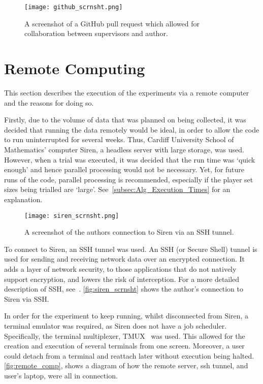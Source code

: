 \begin{figure}
    \centering
    \texttt{[image: github\_scrnsht.png]}
    \caption{A screenshot of a GitHub pull request which allowed for collaboration between supervisors and author.}\label{fig:github_scrnsht}
\end{figure}


\section{Remote Computing}\label{sec:Remote_Computing}
This section describes the execution of the experiments via a remote
computer and the reasons for doing so.

Firstly, due to the volume of data that was planned on being collected, it was
decided that running the data remotely would be ideal, in order to allow the
code to run uninterrupted for several weeks. Thus, Cardiff University School of
Mathematics' computer Siren, a headless server with large storage, was used. However, when a trial was executed,
it was decided that the run time was `quick enough' and hence parallel
processing would not be necessary. Yet, for future runs of the code, parallel
processing is recommended, especially if the player set sizes being trialled are
`large'. See~\autoref{subsec:Alg_Execution_Times} for an explanation.

\begin{figure}
    \centering
    \texttt{[image: siren\_scrnsht.png]}
    \caption{A screenshot of the authors connection to Siren via an SSH tunnel.}\label{fig:siren_scrnsht}
\end{figure}


To connect to Siren, an SSH tunnel was used. An SSH (or Secure Shell) tunnel is
used for sending and receiving network data over an encrypted connection. It adds
a layer of network security, to those applications that do not natively support
encryption, and lowers the risk of interception. For a more detailed description
of SSH, see~\cite{SSH.COM2016}. \autoref{fig:siren_scrnsht} shows the author's
connection to Siren via SSH\@. 


In order for the experiment to keep running, whilst disconnected
from Siren, a terminal emulator was required, as Siren does not have a job
scheduler. Specifically, the terminal multiplexer, TMUX~\cite{Marriott} was used. This allowed
for the creation and execution of several terminals from one screen. Moreover, a
user could detach from a terminal and reattach later without execution being
halted. \autoref{fig:remote_comp}, shows a diagram of how the remote server, ssh tunnel, and user's
laptop, were all in connection.

